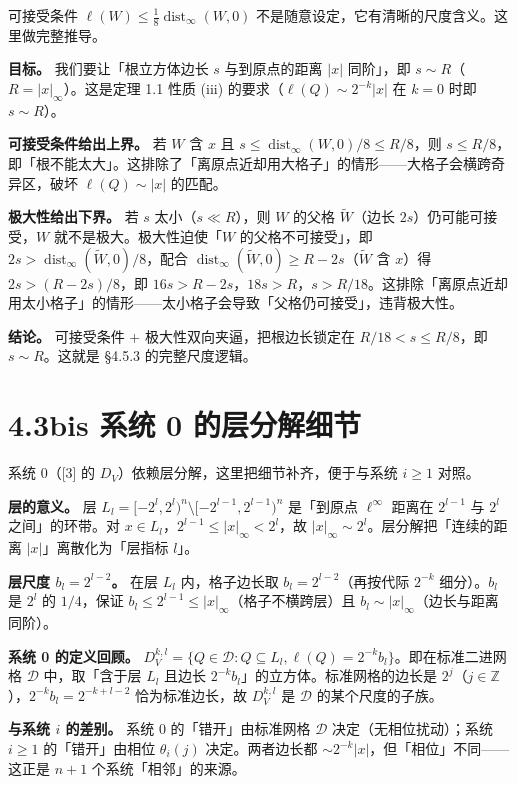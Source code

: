 \documentclass[a4paper,11pt,openany]{ctexbook}
\numberwithin{equation}{chapter}
\numberwithin{figure}{chapter}
\numberwithin{table}{chapter}
\begin{document}
可接受条件 $\ell(W)\le\frac18\operatorname{dist}_\infty(W,0)$ 不是随意设定，它有清晰的尺度含义。这里做完整推导。

\textbf{目标。} 我们要让「根立方体边长 $s$ 与到原点的距离 $|x|$ 同阶」，即 $s\sim R$（$R=|x|_\infty$）。这是定理 1.1 性质 (iii) 的要求（$\ell(Q)\sim2^{-k}|x|$ 在 $k=0$ 时即 $s\sim R$）。

\textbf{可接受条件给出上界。} 若 $W$ 含 $x$ 且 $s\le\operatorname{dist}_\infty(W,0)/8\le R/8$，则 $s\le R/8$，即「根不能太大」。这排除了「离原点近却用大格子」的情形——大格子会横跨奇异区，破坏 $\ell(Q)\sim|x|$ 的匹配。

\textbf{极大性给出下界。} 若 $s$ 太小（$s\ll R$），则 $W$ 的父格 $\widetilde W$（边长 $2s$）仍可能可接受，$W$ 就不是极大。极大性迫使「$W$ 的父格不可接受」，即 $2s>\operatorname{dist}_\infty(\widetilde W,0)/8$，配合 $\operatorname{dist}_\infty(\widetilde W,0)\ge R-2s$（$\widetilde W$ 含 $x$）得 $2s>(R-2s)/8$，即 $16s>R-2s$，$18s>R$，$s>R/18$。这排除「离原点近却用太小格子」的情形——太小格子会导致「父格仍可接受」，违背极大性。

\textbf{结论。} 可接受条件 + 极大性双向夹逼，把根边长锁定在 $R/18<s\le R/8$，即 $s\sim R$。这就是 §4.5.3 的完整尺度逻辑。

\section{4.3bis 系统 0 的层分解细节}

系统 0（[3] 的 $D_V$）依赖层分解，这里把细节补齐，便于与系统 $i\ge1$ 对照。

\textbf{层的意义。} 层 $L_l=[-2^l,2^l)^n\setminus[-2^{l-1},2^{l-1})^n$ 是「到原点 $\ell^\infty$ 距离在 $2^{l-1}$ 与 $2^l$ 之间」的环带。对 $x\in L_l$，$2^{l-1}\le|x|_\infty<2^l$，故 $|x|_\infty\sim2^l$。层分解把「连续的距离 $|x|$」离散化为「层指标 $l$」。

\textbf{层尺度 $b_l=2^{l-2}$。} 在层 $L_l$ 内，格子边长取 $b_l=2^{l-2}$（再按代际 $2^{-k}$ 细分）。$b_l$ 是 $2^l$ 的 $1/4$，保证 $b_l\le2^{l-1}\le|x|_\infty$（格子不横跨层）且 $b_l\sim|x|_\infty$（边长与距离同阶）。

\textbf{系统 0 的定义回顾。} $D_V^{k,l}=\{Q\in\mathcal D:Q\subseteq L_l,\ell(Q)=2^{-k}b_l\}$。即在标准二进网格 $\mathcal D$ 中，取「含于层 $L_l$ 且边长 $2^{-k}b_l$」的立方体。标准网格的边长是 $2^j$（$j\in\mathbb Z$），$2^{-k}b_l=2^{-k+l-2}$ 恰为标准边长，故 $D_V^{k,l}$ 是 $\mathcal D$ 的某个尺度的子族。

\textbf{与系统 $i$ 的差别。} 系统 0 的「错开」由标准网格 $\mathcal D$ 决定（无相位扰动）；系统 $i\ge1$ 的「错开」由相位 $\theta_i(j)$ 决定。两者边长都 $\sim2^{-k}|x|$，但「相位」不同——这正是 $n+1$ 个系统「相邻」的来源。
\end{document}

